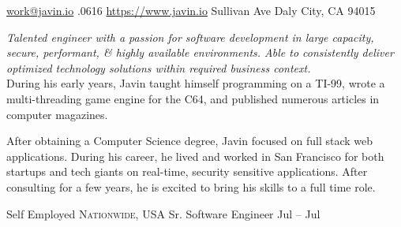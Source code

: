 \documentclass[10pt,a4paper]{article}
\begin{document}
\sloppy  %



\nobreakvspace{0.3em}  %

\noindent\href{mailto:work.at.javin.io}{work\mbox{}@\mbox{}javin.io}\sbull
{}.0616\sbull
\href{https://www.javin.io}{https://www.javin.io}
 Sullivan Ave
\sbull Daly City, CA 94015

\spacedhrule{0.6em}{-0.4em}  %


\vspace{-1.3em}  %
\begin{multicols}{2}  %
\noindent \emph{Talented engineer with a passion for software development in large capacity, secure, performant, \& highly available environments. Able to consistently deliver optimized technology solutions within required business context. }
\vspace{0.3em}
\\
{During his early years, Javin taught himself programming on a TI-99, wrote a multi-threading game engine for the C64, and published numerous articles in computer magazines.
}

{After obtaining a Computer Science degree, Javin focused on full stack web applications. During his career, he lived and worked in San Francisco for both startups and tech giants on real-time, security sensitive applications. After consulting for a few years, he is excited to bring his skills to a full time role. }

\end{multicols}

\spacedhrule{0em}{-0.5em}


\headedsection
  {{Self Employed}}
  {\textsc{Nationwide, USA}} {
  \headedsubsection
    {Sr. Software Engineer}
    {Jul  -- Jul }
    {}
}
\end{document}
